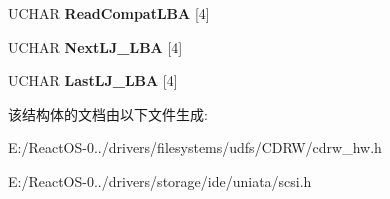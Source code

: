 \begin{DoxyCompactItemize}
U\+C\+H\+AR {\bfseries Read\+Compat\+L\+BA} \mbox{[}4\mbox{]}
\item 
\mbox{\label{struct___t_r_a_c_k___i_n_f_o___b_l_o_c_k_a8d7e954f1c4b7c1fdbd05b2a2cd756ba}} 
U\+C\+H\+AR {\bfseries Next\+L\+J\+\_\+\+L\+BA} \mbox{[}4\mbox{]}
\item 
\mbox{\label{struct___t_r_a_c_k___i_n_f_o___b_l_o_c_k_a851507fc3a0015b58a917007dbbd5567}} 
U\+C\+H\+AR {\bfseries Last\+L\+J\+\_\+\+L\+BA} \mbox{[}4\mbox{]}
\end{DoxyCompactItemize}


该结构体的文档由以下文件生成\+:\begin{DoxyCompactItemize}
\item 
E\+:/\+React\+O\+S-\/0../drivers/filesystems/udfs/\+C\+D\+R\+W/cdrw\+\_\+hw.\+h\item 
E\+:/\+React\+O\+S-\/0../drivers/storage/ide/uniata/scsi.\+h\end{DoxyCompactItemize}
